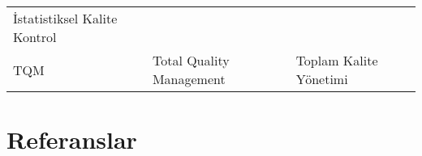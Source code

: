 \documentclass[
]{book}
\begin{document}
\begin{longtable}[]{@{}lll@{}}
\begin{minipage}[t]{0.31\columnwidth}
İstatistiksel Kalite Kontrol\strut
\end{minipage}\tabularnewline
\begin{minipage}[t]{0.31\columnwidth}\raggedright
TQM\strut
\end{minipage} & \begin{minipage}[t]{0.29\columnwidth}\raggedright
Total Quality Management\strut
\end{minipage} & \begin{minipage}[t]{0.31\columnwidth}\raggedright
Toplam Kalite Yönetimi\strut
\end{minipage}\tabularnewline
\bottomrule
\end{longtable}

\hypertarget{referanslar}{%
\chapter*{Referanslar}\label{referanslar}}

  
\end{document}
